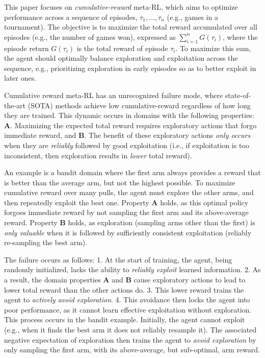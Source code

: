 \documentclass{article}
\begin{document}
This paper focuses on \emph{cumulative-reward} meta-RL, which aims to optimize performance across a sequence of episodes,  \(\tau_1, \dots, \tau_n\) (e.g., games in a tournament). The objective is to maximize the total reward accumulated over all episodes (e.g., the number of games won), expressed as \(\sum_{i=1}^n G(\tau_i)\), where the episode return \(G(\tau_i)\) is the total reward of episode \(\tau_i\). To maximize this sum, the agent should optimally balance exploration and exploitation across the sequence, e.g., prioritizing exploration in early episodes so as to better exploit in later ones.

Cumulative reward meta-RL has an unrecognized failure mode, where state-of-the-art (SOTA) methods achieve low cumulative-reward regardless of how long they are trained. This dynamic occurs in domains with the following properties:
\textbf{A}. Maximizing the expected total reward requires exploratory actions that forgo immediate reward, and 
\textbf{B}. The benefit of these exploratory actions \emph{only occurs} when they are \emph{reliably} followed by good exploitation (i.e., if exploitation is too inconsistent, then exploration results in \emph{lower} total reward).

An example is a bandit domain where the first arm always provides a reward that is better than the average arm, but not the highest possible. To maximize cumulative reward over many pulls, the agent must explore the other arms, and then repeatedly exploit the best one. Property \textbf{A} holds, as this optimal policy forgoes immediate reward by not sampling the first arm and its above-average reward. Property \textbf{B} holds, as exploration (sampling arms other than the first) is \emph{only valuable} when it is followed by sufficiently consistent exploitation (reliably re-sampling the best arm).

The failure occurs as follows: 
1. At the start of training, the agent, being randomly initialized, lacks the ability to \emph{reliably exploit} learned information. 
2. As a result, the domain properties \textbf{A} and \textbf{B} cause exploratory actions to lead to lower total reward than the other actions do.
3. This lower reward trains the agent to \emph{actively avoid exploration}. 
4. This avoidance then locks the agent into poor performance, as it cannot learn effective exploitation without exploration. This process occurs in the bandit example. Initially, the agent cannot exploit (e.g., when it finds the best arm it does not reliably resample it). The associated negative expectation of exploration then trains the agent to \emph{avoid exploration} by only sampling the first arm, with its above-average, but sub-optimal, arm reward.
\end{document}
